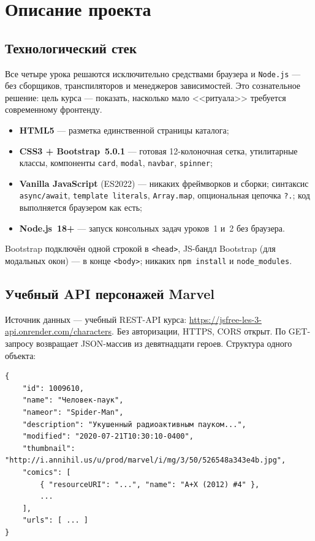 \chapter{Описание проекта}
\label{ch:project}

\section{Технологический стек}

Все четыре урока решаются исключительно средствами браузера и
\texttt{Node.js} --- без сборщиков, транспиляторов и менеджеров
зависимостей. Это сознательное решение: цель курса --- показать,
насколько мало <<ритуала>> требуется современному фронтенду.

\begin{itemize}
  \item \textbf{HTML5} --- разметка единственной страницы каталога;
  \item \textbf{CSS3 + Bootstrap~5.0.1} --- готовая 12-колоночная
        сетка, утилитарные классы, компоненты
        \texttt{card}, \texttt{modal}, \texttt{navbar},
        \texttt{spinner};
  \item \textbf{Vanilla JavaScript} (ES2022) --- никаких фреймворков
        и сборки; синтаксис \texttt{async/await},
        \texttt{template literals}, \texttt{Array.map}, опциональная
        цепочка \texttt{?.}; код выполняется браузером как есть;
  \item \textbf{Node.js~18+} --- запуск консольных задач уроков~1
        и~2 без браузера.
\end{itemize}

Bootstrap подключён одной строкой в \texttt{<head>}, JS-бандл
Bootstrap (для модальных окон) --- в конце \texttt{<body>}; никаких
\texttt{npm install} и \texttt{node\_modules}.

\section{Учебный API персонажей Marvel}

Источник данных --- учебный REST-API курса:
\url{https://jsfree-les-3-api.onrender.com/characters}. Без
авторизации, HTTPS, CORS открыт. По GET-запросу возвращает
JSON-массив из девятнадцати героев. Структура одного объекта:

\begin{lstlisting}[caption={Фрагмент ответа API (один персонаж)},captionpos=b]
{
    "id": 1009610,
    "name": "Человек-паук",
    "nameor": "Spider-Man",
    "description": "Укушенный радиоактивным пауком...",
    "modified": "2020-07-21T10:30:10-0400",
    "thumbnail": "http://i.annihil.us/u/prod/marvel/i/mg/3/50/526548a343e4b.jpg",
    "comics": [
        { "resourceURI": "...", "name": "A+X (2012) #4" },
        ...
    ],
    "urls": [ ... ]
}
\end{lstlisting}


